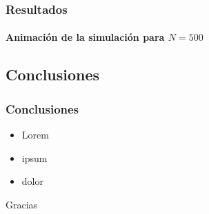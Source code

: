 \documentclass[hyperref={pdfpagelayout=SinglePage}]{beamer}
\begin{document}
\begin{frame}
\frametitle{Resultados}
\framesubtitle{Animación de la simulación para $N = 500$}
\begin{figure}[H]
	\centering
\end{figure}
\end{frame}

\subsection{Conclusiones}

\begin{frame}
\frametitle{Conclusiones}
\begin{itemize}
	\item Lorem
	\item ipsum
	\item dolor
\end{itemize}
\end{frame}

\begin{frame}[plain,c]
\begin{center}
	\Huge Gracias
\end{center}
\end{frame}
\end{document}

